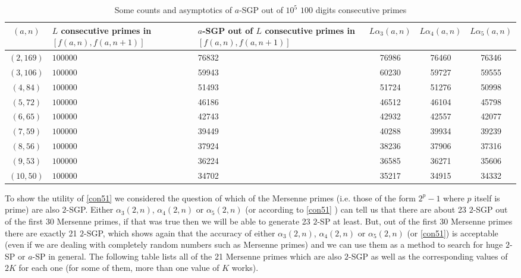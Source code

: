 \documentclass{amsart}
\numberwithin{equation}{section}
\begin{document}
\begin{table}[!h]
	
	\begin{tabularx}{\textwidth}{|c|X|X|c|c|c|}
		\hline
		$(a,n)$ & $L$ consecutive primes in $[f(a,n),f(a,n+1)]$ & $a$-SGP out of $L$ consecutive primes in $[f(a,n),f(a,n+1)]$ & $L \alpha_3(a,n)$ & $L \alpha_4(a,n)$ & $L \alpha_5(a,n)$ \\
		\hline
		$(2,169)$ & $100000$ & 76832 & 76986 & 76460 & 76346 \\
		\hline
		$(3,106)$ & $100000$ & 59943 & 60230 & 59727 & 59555 \\
		\hline
		$(4,84)$ & $100000$ & 51493 & 51724 & 51276 & 50998 \\
		\hline
		$(5,72)$ & $100000$ & 46186 & 46512 & 46104 & 45798 \\
		\hline
		$(6,65)$ & $100000$ & 42743 & 42932 & 42557 & 42077 \\
		\hline
		$(7,59)$ & $100000$ & 39449 & 40288 & 39934 & 39239 \\
		\hline 
		$(8,56)$ & $100000$ & 37924 & 38236 & 37906 & 37316 \\
		\hline 
		$(9,53)$ & $100000$ & 36224 & 36585 & 36271 & 35606 \\
		\hline
		$(10,50)$ & $100000$ & 34702 & 35217 & 34915 & 34332 \\
		\hline       
	\end{tabularx}
	\caption{Some counts and asymptotics of $a$-SGP out of $10^5$ $100$ digits consecutive primes}
	\label{estimates3}
\end{table}

To show the utility of \ref{con51} we considered the question of which of the Mersenne primes (i.e. those of the form $2^p-1$ where $p$ itself is prime) are also $2$-SGP. Either $\alpha_3(2,n)$, $\alpha_4(2,n)$ or $\alpha_5(2,n)$ (or according to \ref{con51} ) can tell us that there are about 23 $2$-SGP out of the first 30 Mersenne primes, if that was true then we will be able to generate 23 $2$-SP at least. But, out of the first 30 Mersenne primes there are exactly 21 $2$-SGP, which shows again that the accuracy of either $\alpha_3(2,n)$, $\alpha_4(2,n)$ or $\alpha_5(2,n)$ (or \ref{con51}) is acceptable (even if we are dealing with completely random numbers such as Mersenne primes) and we can use them as a method to search for huge $2$-SP or $a$-SP in general. The following table lists all of the 21 Mersenne primes which are also $2$-SGP as well as the corresponding values of $2K$ for each one (for some of them, more than one value of $K$ works). 
\end{document}
